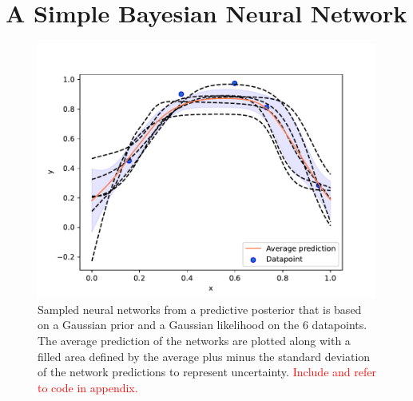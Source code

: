 \section{A Simple Bayesian Neural Network} \label{sec:simple_BNN}

\begin{figure}
    \centering
    \includegraphics[width=\textwidth,height=\textheight,keepaspectratio]{pics/figure_simple_BNN.pdf}
    \caption{Sampled neural networks from a predictive posterior that is based on a Gaussian prior and a Gaussian likelihood on the 6 datapoints. The average prediction of the networks are plotted along with a filled area defined by the average plus minus the standard deviation of the network predictions to represent uncertainty. \textcolor{red}{Include and refer to code in appendix.}}
    \label{fig:simple_BNN}
\end{figure}

